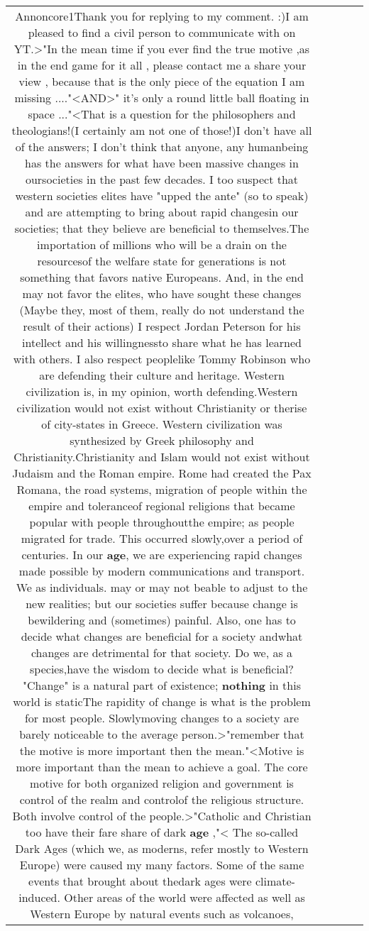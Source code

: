 \documentclass[11pt]{article}
\newlength\mylength
\begin{document}
\begin{center}
\begin{longtable}{|C{.65\mylength}|C{.30\mylength}|C{.12\mylength}|C{.12\mylength}|C{.12\mylength}|}
  \small Annoncore1Thank you for replying to my comment. :)I am pleased to find a civil person to communicate with on YT.>"In the mean time if you ever find the true motive ,as in the end game for it all , please contact me a share your view , because that is the only piece of the equation I am missing ...."<AND>" it's only a round little ball floating in space ..."<That is a question for the philosophers and theologians!(I certainly am not one of those!)I don't have all of the answers; I don't think that anyone, any humanbeing has the answers for what have been massive changes in oursocieties in the past few decades. I too suspect that western societies elites have "upped the ante" (so to speak) and are attempting to bring about rapid changesin our societies; that they believe are beneficial to themselves.The importation of millions who will be a drain on the resourcesof the welfare state for generations is not something that favors native Europeans. And, in the end may not favor the elites, who have sought these changes (Maybe they, most of them, really do not understand the result of their actions) I respect Jordan Peterson for his intellect and his willingnessto share what he has learned with others. I also respect peoplelike Tommy Robinson who are defending their culture and heritage. Western civilization is, in my opinion, worth defending.Western civilization would not exist without Christianity or therise of city-states in Greece. Western civilization was synthesized by Greek philosophy and Christianity.Christianity and Islam would not exist without Judaism and the Roman empire. Rome had created the Pax Romana, the road systems, migration of people within the empire and toleranceof regional religions that became popular with people throughoutthe empire; as people migrated for trade.  This occurred slowly,over a period of centuries. In our \textbf{age}, we are experiencing rapid changes made possible by modern communications and transport. We as individuals. may or may not beable to adjust to the new realities; but our societies suffer because change is bewildering and (sometimes) painful.  Also, one has to decide what changes are beneficial for a society andwhat changes are detrimental for that society. Do we, as a species,have the wisdom to decide what is beneficial?  "Change" is a natural part of existence; \textbf{nothing} in this world is staticThe rapidity of change is what is the problem for most people. Slowlymoving changes to a society are barely noticeable to the average person.>"remember that the motive is more important then the mean."<Motive is more important than the mean to achieve a goal. The core motive for both organized religion and government is control of the realm and controlof the religious structure. Both involve control of the people.>"Catholic and Christian too have their fare share of dark \textbf{age} ,"< The so-called Dark Ages (which we, as moderns, refer mostly to Western Europe) were caused my many factors. Some of the same events that brought about thedark ages were climate-induced. Other areas of the world were affected as well as Western Europe by natural events such as volcanoes, 
\end{longtable}
\end{center}
\end{document}
